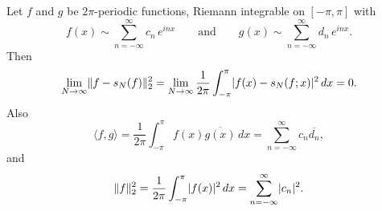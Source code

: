 \begin{samepage}
\begin{thm} 
Let $f$ and $g$ be $2\pi$-periodic functions, Riemann integrable 
on $[-\pi,\pi]$
with
\begin{equation*}
f(x) \sim
\sum_{n=-\infty}^\infty c_n \,e^{inx}
\qquad \text{and} \qquad
g(x) \sim
\sum_{n=-\infty}^\infty d_n \,e^{inx} .
\end{equation*}
Then
\begin{equation*}
\lim_{N\to\infty} \lVert {f-s_N(f)} \rVert_2^2 = 
\lim_{N\to\infty}
\frac{1}{2\pi}
\int_{-\pi}^\pi
\lvert {f(x)-s_N(f;x)} \rvert^2 \, dx
=0 .
\end{equation*}
Also
\begin{equation*}
\langle f , g \rangle =
\frac{1}{2\pi}
\int_{-\pi}^\pi
f(x) \overline{g(x)}\, dx
=
\sum_{n=-\infty}^\infty c_n \overline{d_n} ,
\end{equation*}
and
\begin{equation*}
\lVert {f} \rVert_2^2
=
\frac{1}{2\pi}
\int_{-\pi}^\pi
\lvert {f(x)} \rvert^2 \, dx
=
\sum_{n=-\infty}^\infty \lvert {c_n} \rvert^2.
\end{equation*}
\end{thm}
\end{samepage}

